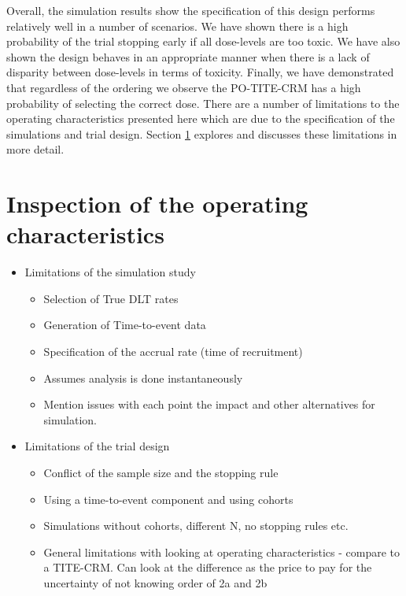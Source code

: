Overall, the simulation results show the specification of this design performs relatively well in a number of scenarios. We have shown there is a high probability of the trial stopping early if all dose-levels are too toxic. We have also shown the design behaves in an appropriate manner when there is a lack of disparity between dose-levels in terms of toxicity. Finally, we have demonstrated that regardless of the ordering we observe the PO-TITE-CRM has a high probability of selecting the correct dose. There are a number of limitations to the operating characteristics presented here which are due to the specification of the simulations and trial design. Section \ref{section2.4} explores and discusses these limitations in more detail.


\section{Inspection of the operating characteristics}  
\label{section2.4}%


\begin{itemize}
	\item Limitations of the simulation study 
		\begin{itemize}
			\item Selection of True DLT rates 
			\item Generation of Time-to-event data
			\item Specification of the accrual rate (time of recruitment)
			\item Assumes analysis is done instantaneously 
			\item Mention issues with each point the impact and other alternatives for simulation. 
		\end{itemize}
	\item Limitations of the trial design 
		\begin{itemize}
			\item Conflict of the sample size and the stopping rule
			\item Using a time-to-event component and using cohorts 
			\item Simulations without cohorts, different N, no stopping rules etc. 
			\item General limitations with looking at operating characteristics - compare to a TITE-CRM. Can look at the difference as the price to pay for the uncertainty of not knowing order of 2a and 2b 
		\end{itemize}
\end{itemize}

